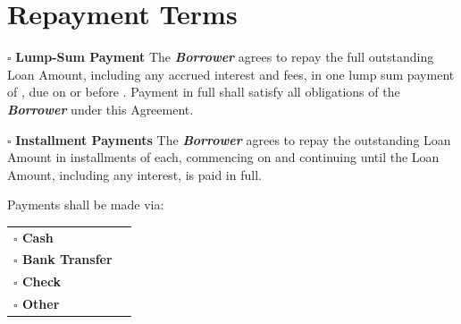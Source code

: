 
\section{Repayment Terms}
\label{sec:repayment}

$\square$ \textbf{Lump-Sum Payment}
The \textbf{\textit{Borrower}} agrees to repay the full outstanding Loan Amount, including any accrued interest and fees, in one lump sum payment of \LendedAmountNumber{} \LendedAmountCurrencySymbol{}, due on or before \LoanLumpSumDue{}. Payment in full shall satisfy all obligations of the \textbf{\textit{Borrower}} under this Agreement.

\vspace{0.3cm}

\noindent $\square$ \textbf{Installment Payments}
The \textbf{\textit{Borrower}} agrees to repay the outstanding Loan Amount in \LoanInstallmentPeriod{} installments of \LoanInstallmentAmount{}  each, commencing on \LoanInstallmentStart{}  and continuing until the Loan Amount, including any interest, is paid in full.

\vspace{0.3cm}

\noindent Payments shall be made via:

\vspace{0.3cm}

\noindent
\begin{tabular}{p{6cm} p{10cm}}
\textbf{$\square$ Cash} & \LoanRepaymentCashMethod{} \\ 
\textbf{$\square$ Bank Transfer} & \LoanRepaymentBankMethod{} \\ 
\textbf{$\square$ Check} & \LoanRepaymentCheckMethod{} \\ 
\textbf{$\square$ Other} & \LoanRepaymentOtherMethod{} \\ 
\end{tabular}

